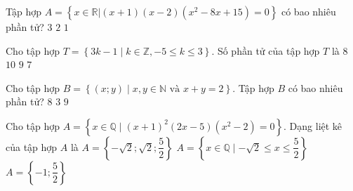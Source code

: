 \begin{ex}%
	Tập hợp $A = \left\{x \in \mathbb{R}\big|\left(x + 1\right)\left(x - 2\right)\left(x^2 -  8x + 15\right) = 0\right\}$ có bao nhiêu phần tử?
		{$3$} 
		 {$2$}
		{$1$} 
\end{ex}

\begin{ex}%
	Cho tập hợp  $T=\left\{3k-1\;\big|\;k\in\mathbb{Z},-5\leq k\leq 3\right\}$. Số phần tử của tập hợp $T$ là
	\choice 
		 {$8$}
		{$10$} 
		{\True $9$} 
		{$7$} 
\end{ex}

\begin{ex}%
	Cho tập hợp  $B = \left\{(x;y) \mid x,y \in \mathbb{N} \text{ và } x+y= 2\right\}$. Tập hợp $B$ có bao nhiêu phần tử?
		{$8$} 
		{\True  $3$}
		{$9$} 
\end{ex}

\begin{ex}%
	Cho tập  hợp $A = \left\{x \in \mathbb{Q} \mid (x+1)^2(2x-5)(x^2-2) = 0\right\}$. Dạng liệt kê của tập hợp $A$ là
		{$A = \left\{- \sqrt{2}; \sqrt{2}; \dfrac{5}{2}\right\}  $}
		{$A =  \left\{x \in \mathbb{Q} \mid -\sqrt{2} \le x \le \dfrac{5}{2} \right\} $}
		{\True $A = \left\{  -1; \dfrac{5}{2}\right\} $}
\end{ex}

